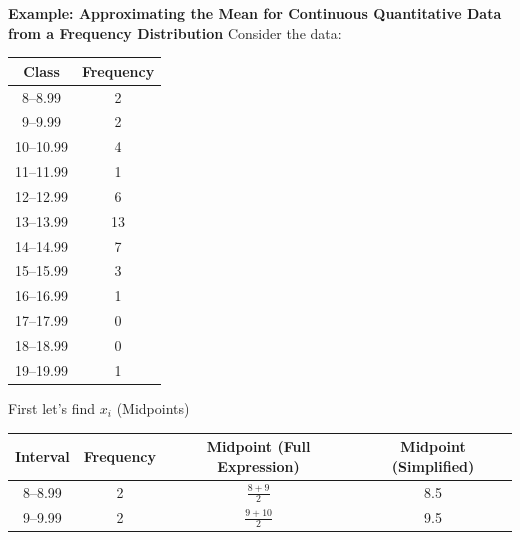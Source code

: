 \documentclass{report}
\begin{document}
         \bigbreak \noindent 
         \begin{mdframed}
           \textbf{Example: Approximating the Mean for Continuous Quantitative Data from a Frequency Distribution}
           \bigbreak \noindent 
           Consider the data:
           \begin{center}
               \begin{tabular}{|c|c|}
                    \hline
                    Class & Frequency \\
                    \hline
                    8--8.99 & 2 \\
                    \hline
                    9--9.99 & 2 \\
                    \hline
                    10--10.99 & 4 \\
                    \hline
                    11--11.99 & 1 \\
                    \hline
                    12--12.99 & 6 \\
                    \hline
                    13--13.99 & 13 \\
                    \hline
                    14--14.99 & 7 \\
                    \hline
                    15--15.99 & 3 \\
                    \hline
                    16--16.99 & 1 \\
                    \hline
                    17--17.99 & 0 \\
                    \hline
                    18--18.99 & 0 \\
                    \hline
                    19--19.99 & 1 \\
                    \hline
                    \end{tabular}
           \end{center}
           \bigbreak \noindent 
           First let's find $x_{i}$ (Midpoints)
           \begin{center}
               \begin{tabular}{|c|c|c|c|}
                    \hline
                    Interval & Frequency & Midpoint (Full Expression) & Midpoint (Simplified) \\
                    \hline
                    8--8.99 & 2 & $\frac{8 + 9}{2}$ & 8.5 \\
                    \hline
                    9--9.99 & 2 & $\frac{9 + 10}{2}$ & 9.5 \\
                    \hline

\end{tabular}
\end{center}
\end{mdframed}
\end{document}
